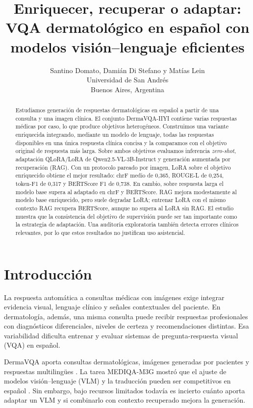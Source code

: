 \documentclass[11pt]{article}
\title{Enriquecer, recuperar o adaptar: VQA dermatológico en español con modelos visión--lenguaje eficientes}
\author{
  Santino Domato, Damián Di Stefano y Matías Lein \\
  Universidad de San Andrés \\
  Buenos Aires, Argentina
}
\begin{document}
\maketitle

\begin{abstract}
Estudiamos generación de respuestas dermatológicas en español a partir de una consulta y una imagen clínica. El conjunto DermaVQA-IIYI contiene varias respuestas médicas por caso, lo que produce objetivos heterogéneos. Construimos una variante enriquecida integrando, mediante un modelo de lenguaje, todas las respuestas disponibles en una única respuesta clínica concisa y la comparamos con el objetivo original de respuesta más larga. Sobre ambos objetivos evaluamos inferencia \emph{zero-shot}, adaptación QLoRA/LoRA de Qwen2.5-VL-3B-Instruct y generación aumentada por recuperación (RAG). Con un protocolo pareado por imagen, LoRA sobre el objetivo enriquecido obtiene el mejor resultado: chrF medio de 0,365, ROUGE-L de 0,254, token-F1 de 0,317 y BERTScore F1 de 0,738. En cambio, sobre respuesta larga el modelo base supera al adaptado en chrF y BERTScore. RAG mejora modestamente al modelo base enriquecido, pero suele degradar LoRA; entrenar LoRA con el mismo contexto RAG recupera BERTScore, aunque no supera al LoRA sin RAG. El estudio muestra que la consistencia del objetivo de supervisión puede ser tan importante como la estrategia de adaptación. Una auditoría exploratoria también detecta errores clínicos relevantes, por lo que estos resultados no justifican uso asistencial.
\end{abstract}

\section{Introducción}

La respuesta automática a consultas médicas con imágenes exige integrar evidencia visual, lenguaje clínico y señales contextuales del paciente. En dermatología, además, una misma consulta puede recibir respuestas profesionales con diagnósticos diferenciales, niveles de certeza y recomendaciones distintas. Esa variabilidad dificulta entrenar y evaluar sistemas de pregunta-respuesta visual (VQA) en español.

DermaVQA aporta consultas dermatológicas, imágenes generadas por pacientes y respuestas multilingües \citep{yim2024dermavqa}. La tarea MEDIQA-M3G mostró que el ajuste de modelos visión--lenguaje (VLM) y la traducción pueden ser competitivos en español \citep{yim2024mediqa,bauer2024ikim}. Sin embargo, bajo recursos limitados todavía es incierto cuánto aporta adaptar un VLM y si combinarlo con contexto recuperado mejora la generación.
\end{document}
